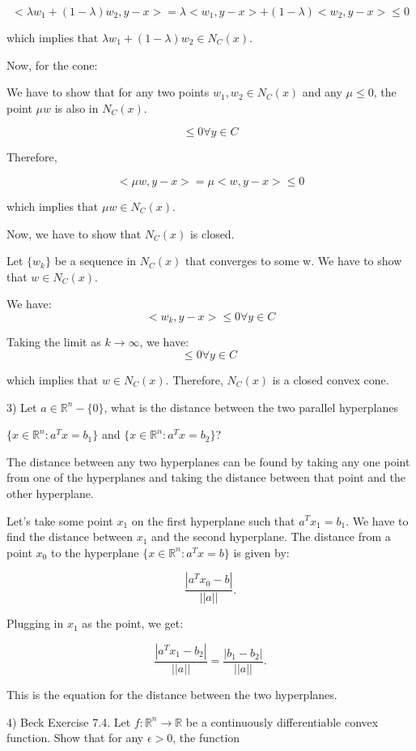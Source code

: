 \documentclass{article}
\newcommand{\RR}{\mathbb{R}}
\begin{document}
\[<\lambda w_1 + (1 - \lambda) w_2, y-x> = \lambda <w_1, y-x> + (1 - \lambda) <w_2, y-x> \leq 0\]

which implies that $\lambda w_1 + (1 - \lambda) w_2 \in N_{C}(x)$.

Now, for the cone:

We have to show that for any two points $w_1, w_2 \in N_{C}(x)$
and any $\mu \leq 0$,
the point $\mu w$ is also in $N_{C}(x)$.

\[<w, y-x> \leq 0 \forall y \in C\]

Therefore,

\[<\mu w, y-x> = \mu <w, y-x> \leq 0\]

which implies that $\mu w \in N_{C}(x)$.

Now, we have to show that $N_{C}(x)$ is closed.

Let $\{w_k\}$ be a sequence in $N_{C}(x)$ that
converges to some w. We have to show that $w \in N_{C}(x)$.

We have:
\[<w_k, y-x> \leq 0 \forall y \in C\]

Taking the limit as $k \to \infty$, we have:
\[<w, y-x> \leq 0 \forall y \in C\>\]

which implies that $w \in N_{C}(x)$. Therefore, $N_{C}(x)$ is a closed convex cone.


3) Let $a \in \RR^n - \{0\}$, what is the distance between the two parallel hyperplanes

$\{x \in \RR^n: a^T x = b_1\}$ and $\{x \in \RR^n: a^T x = b_2\}$?

The distance between any two hyperplanes can be found
by taking any one point from one of the hyperplanes and
taking the distance between that point and the other hyperplane.

Let's take some point $x_1$ on the first hyperplane such that
$a^T x_1 = b_1$. We have to find the distance between $x_1$
and the second hyperplane. The distance from a point $x_0$
to the hyperplane $\{x \in \RR^n : a^T x = b\}$ is given by:

\[\frac{|a^T x_0 - b|}{||a||}.\]

Plugging in $x_1$ as the point, we get:

\[\frac{|a^T x_1 - b_2|}{||a||} = \frac{|b_1 - b_2|}{||a||}.\]

This is the equation for the distance between the two hyperplanes.


4) Beck Exercise 7.4. Let $f : \RR^n \to \RR$ be a continuously differentiable convex function. Show that for any $\epsilon > 0$, the function
\end{document}
